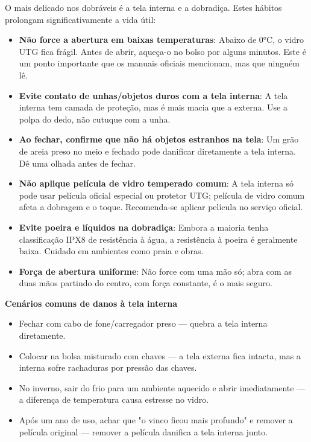 
O mais delicado nos dobráveis é a tela interna e a dobradiça. Estes hábitos prolongam significativamente a vida útil:

\begin{itemize}
  \item \textbf{Não force a abertura em baixas temperaturas}: Abaixo de 0°C, o vidro UTG fica frágil. Antes de abrir, aqueça-o no bolso por alguns minutos. Este é um ponto importante que os manuais oficiais mencionam, mas que ninguém lê.
  \item \textbf{Evite contato de unhas/objetos duros com a tela interna}: A tela interna tem camada de proteção, mas é mais macia que a externa. Use a polpa do dedo, não cutuque com a unha.
  \item \textbf{Ao fechar, confirme que não há objetos estranhos na tela}: Um grão de areia preso no meio e fechado pode danificar diretamente a tela interna. Dê uma olhada antes de fechar.
  \item \textbf{Não aplique película de vidro temperado comum}: A tela interna só pode usar película oficial especial ou protetor UTG; película de vidro comum afeta a dobragem e o toque. Recomenda-se aplicar película no serviço oficial.
  \item \textbf{Evite poeira e líquidos na dobradiça}: Embora a maioria tenha classificação IPX8 de resistência à água, a resistência à poeira é geralmente baixa. Cuidado em ambientes como praia e obras.
  \item \textbf{Força de abertura uniforme}: Não force com uma mão só; abra com as duas mãos partindo do centro, com força constante, é o mais seguro.
\end{itemize}

\textbf{Cenários comuns de danos à tela interna}\par

\begin{itemize}
  \item Fechar com cabo de fone/carregador preso — quebra a tela interna diretamente.
  \item Colocar na bolsa misturado com chaves — a tela externa fica intacta, mas a interna sofre rachaduras por pressão das chaves.
  \item No inverno, sair do frio para um ambiente aquecido e abrir imediatamente — a diferença de temperatura causa estresse no vidro.
  \item Após um ano de uso, achar que "o vinco ficou mais profundo" e remover a película original — remover a película danifica a tela interna junto.
\end{itemize}

